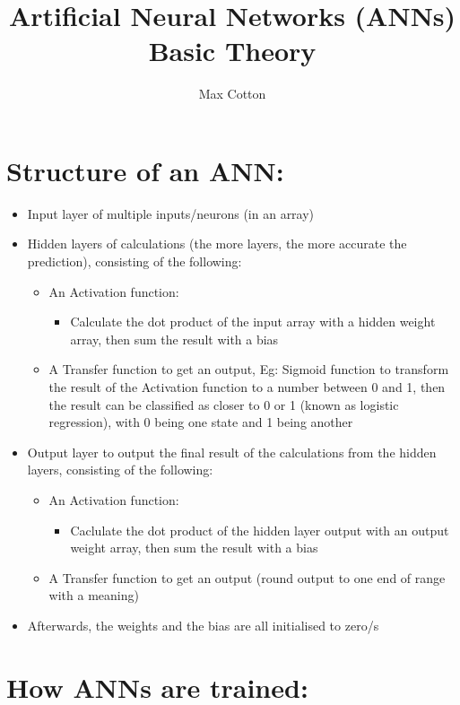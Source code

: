 \documentclass[10pt,a4paper]{article}
\title{Artificial Neural Networks (ANNs) Basic Theory}
\author{Max Cotton}
\date{}
\begin{document}
\maketitle

\section{Structure of an ANN:}

\begin{itemize}
    \item Input layer of multiple inputs/neurons (in an array)
    \item Hidden layers of calculations (the more layers, the more accurate the prediction), consisting of the following:
    \begin{itemize}
        \item An Activation function:
        \begin{itemize}
            \item Calculate the dot product of the input array with a hidden weight array, then sum the result with a bias
        \end{itemize}
        \item A Transfer function to get an output, Eg: Sigmoid function to transform the result of the Activation function to a number between 0 and 1, then the result can be classified as closer to 0 or 1 (known as logistic regression), with 0 being one state and 1 being another
    \end{itemize}
    \item Output layer to output the final result of the calculations from the hidden layers, consisting of the following:
    \begin{itemize}
        \item An Activation function:
        \begin{itemize}
            \item Caclulate the dot product of the hidden layer output with an output weight array, then sum the result with a bias
        \end{itemize}
        \item A Transfer function to get an output (round output to one end of range with a meaning)
    \end{itemize}
    \item Afterwards, the weights and the bias are all initialised to zero/s
\end{itemize}

\section{How ANNs are trained:}
\end{document}
